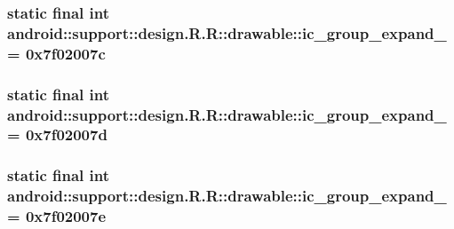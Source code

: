 \hypertarget{classandroid_1_1support_1_1design_1_1_r_1_1drawable_aa3a3e2382a0d8d459977b14d5a5da61}{
\subsubsection[{ic\_\-group\_\-expand\_\-13}]{\setlength{\rightskip}{0pt plus 5cm}static final int android::support::design.R.R::drawable::ic\_\-group\_\-expand\_ = 0x7f02007c}}
\label{classandroid_1_1support_1_1design_1_1_r_1_1drawable_aa3a3e2382a0d8d459977b14d5a5da61}


\hypertarget{classandroid_1_1support_1_1design_1_1_r_1_1drawable_0581d08095b363ce4394c270e9728628}{
\subsubsection[{ic\_\-group\_\-expand\_\-14}]{\setlength{\rightskip}{0pt plus 5cm}static final int android::support::design.R.R::drawable::ic\_\-group\_\-expand\_ = 0x7f02007d}}
\label{classandroid_1_1support_1_1design_1_1_r_1_1drawable_0581d08095b363ce4394c270e9728628}


\hypertarget{classandroid_1_1support_1_1design_1_1_r_1_1drawable_1c5362177658510ad022acf05f63c263}{
\subsubsection[{ic\_\-group\_\-expand\_\-15}]{\setlength{\rightskip}{0pt plus 5cm}static final int android::support::design.R.R::drawable::ic\_\-group\_\-expand\_ = 0x7f02007e}}
\label{classandroid_1_1support_1_1design_1_1_r_1_1drawable_1c5362177658510ad022acf05f63c263}


